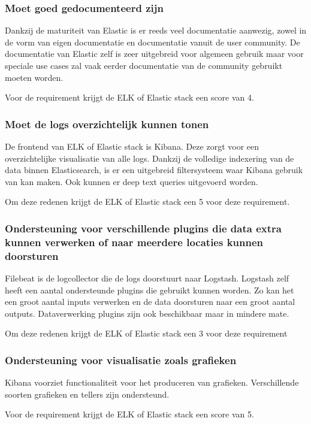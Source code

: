 \subsubsection{Moet goed gedocumenteerd zijn}
Dankzij de maturiteit van Elastic is er reeds veel documentatie aanwezig, zowel in de vorm van eigen documentatie en documentatie vanuit de user community. De documentatie van Elastic zelf is zeer uitgebreid voor algemeen gebruik maar voor speciale use cases zal vaak eerder documentatie van de community gebruikt moeten worden.

Voor de requirement krijgt de ELK of Elastic stack een score van 4.

\subsubsection{Moet de logs overzichtelijk kunnen tonen}
De frontend van ELK of Elastic stack is Kibana. Deze zorgt voor een overzichtelijke visualisatie van alle logs. Dankzij de volledige indexering van de data binnen Elasticsearch, is er een uitgebreid filtersysteem waar Kibana gebruik van kan maken. Ook kunnen er deep text queries uitgevoerd worden.

Om deze redenen krijgt de ELK of Elastic stack een 5 voor deze requirement.

\subsubsection{Ondersteuning voor verschillende plugins die data extra kunnen verwerken of naar meerdere locaties kunnen doorsturen}
Filebeat is de logcollector die de logs doorstuurt naar Logstash. Logstash zelf heeft een aantal ondersteunde plugins die gebruikt kunnen worden. Zo kan het een groot aantal inputs verwerken en de data doorsturen naar een groot aantal outputs. Dataverwerking plugins zijn ook beschikbaar maar in mindere mate.

Om deze redenen krijgt de ELK of Elastic stack een 3 voor deze requirement

\subsubsection{Ondersteuning voor visualisatie zoals grafieken}
Kibana voorziet functionaliteit voor het produceren van grafieken. Verschillende soorten grafieken en tellers zijn ondersteund.

Voor de requirement krijgt de ELK of Elastic stack een score van 5.

